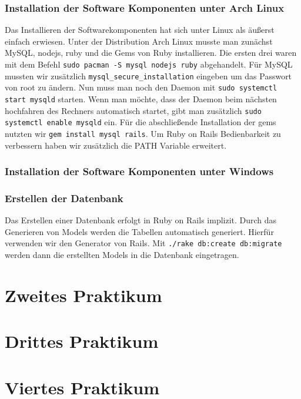 \documentclass[pdftex,10pt,a4paper]{article}
\begin{document}
\subsubsection{Installation der Software Komponenten unter Arch Linux}
Das Installieren der Softwarekomponenten hat sich unter Linux als \"au{\ss}erst einfach erwiesen. Unter der Distribution Arch Linux musste man zun\"achst MySQL, nodejs, ruby und die Gems von Ruby installieren. Die ersten drei waren mit dem Befehl \texttt{sudo pacman -S mysql nodejs ruby} abgehandelt. F\"ur MySQL mussten wir  zus\"atzlich \texttt{mysql\_secure\_installation} eingeben um das Passwort von root zu \"andern. Nun muss man noch den Daemon mit \texttt{sudo systemctl start mysqld} starten. Wenn man m\"ochte, dass der Daemon beim n\"achsten hochfahren des Rechners automatisch startet, gibt man zus\"atzlich \texttt{sudo systemctl enable mysqld} ein. F\"ur die abschlie{\ss}ende Installation der gems nutzten wir \texttt{gem install mysql rails}. Um Ruby on Rails Bedienbarkeit zu verbessern haben wir zus\"atzlich die PATH Variable erweitert.

\subsubsection{Installation der Software Komponenten unter Windows}

\subsubsection{Erstellen der Datenbank}
Das Erstellen einer Datenbank erfolgt in Ruby on Rails implizit. Durch das Generieren von Models werden die Tabellen automatisch generiert. Hierf\"ur verwenden wir den Generator von Rails. Mit \texttt{./rake db:create db:migrate} werden dann die erstellten Models in die Datenbank eingetragen.

\section{Zweites Praktikum}

\section{Drittes Praktikum}

\section{Viertes Praktikum}



\end{document}
